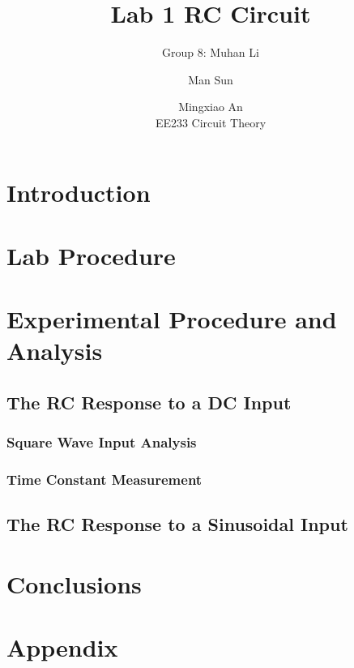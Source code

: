 \documentclass{IEEEtran}
\title{Lab 1 RC Circuit}
\author{Group 8: Muhan Li \and Man Sun \and Mingxiao An \\ EE233 Circuit Theory}
\begin{document}
	
	\maketitle
	
	\begin{abstract}
		
	\end{abstract}
	\section{Introduction}
	
	\section{Lab Procedure}
	
	\section{Experimental Procedure and Analysis}
	\subsection{The RC Response to a DC Input}
	\subsubsection{Square Wave Input Analysis}
		
	\subsubsection{Time Constant Measurement}
		
	\subsection{The RC Response to a Sinusoidal Input}
		
	\section{Conclusions}
		
	\section{Appendix}
		
	
\end{document}
